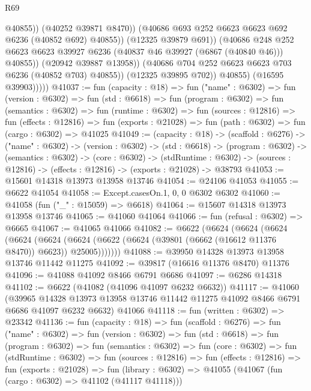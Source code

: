 \begin{lexlean}{R69}
\begin{coremodule}
{                                @40855))
                            (@40252 @39871 @8470))
                          (@40686 @693 @252 @6623 @6623 @692 @6236 (@40852 @692) @40855))
                        (@12325 @39879 @691))
                      (@40686
                        @248
                        @252
                        @6623
                        @6623
                        @39927
                        @6236
                        (@40837 @46 @39927 (@6867 (@40840 @46)))
                        @40855))
                    (@20942 @39887 @13958))
                  (@40686 @704 @252 @6623 @6623 @703 @6236 (@40852 @703) @40855))
                (@12325 @39895 @702))
              @40855)
            (@16595 @39903)))))
@41037 := fun (capacity : @18) =>
  fun ("name" : @6302) =>
  fun (version : @6302) =>
  fun (std : @6618) =>
  fun (program : @6302) =>
  fun (semantics : @6302) =>
  fun (runtime : @6302) =>
  fun (sources : @12816) =>
  fun (effects : @12816) =>
  fun (exports : @21028) => fun (path : @6302) => fun (cargo : @6302) => @41025
@41049 := (capacity : @18) ->
  (scaffold : @6276) ->
  ("name" : @6302) ->
  (version : @6302) ->
  (std : @6618) ->
  (program : @6302) ->
  (semantics : @6302) ->
  (core : @6302) ->
  (stdRuntime : @6302) -> (sources : @12816) -> (effects : @12816) -> (exports : @21028) -> @38793
@41053 := @15601 @14318 @13973 @13958 @13746
@41054 := @24106 @41053
@41055 := @6622 @41054
@41058 := Except.casesOn.{1, 0, 0} @6302 @6302
@41060 := @41058 (fun ("_" : @15059) => @6618)
@41064 := @15607 @14318 @13973 @13958 @13746
@41065 := @41060 @41064
@41066 := fun (refusal : @6302) => @6665
@41067 := @41065 @41066
@41082 := @6622
    (@6624
      (@6624
        (@6624
          (@6624
            (@6624 (@6624 (@6622 (@6624 (@39801 (@6662 (@16612 @11376 @8470)) @6623)) @25005)))))))
@41088 := @39950 @14328 @13973 @13958 @13746 @11442 @11275
@41092 := @39817 (@16616 @11376 @8470) @11376
@41096 := @41088 @41092 @8466 @6791 @6686
@41097 := @6286 @14318
@41102 := @6622 (@41082 (@41096 @41097 @6232 @6632))
@41117 := @41060
    (@39965 @14328 @13973 @13958 @13746 @11442 @11275 @41092 @8466 @6791 @6686 @41097 @6232 @6632)
    @41066
@41118 := fun (written : @6302) => @23342
@41136 := fun (capacity : @18) =>
  fun (scaffold : @6276) =>
  fun ("name" : @6302) =>
  fun (version : @6302) =>
  fun (std : @6618) =>
  fun (program : @6302) =>
  fun (semantics : @6302) =>
  fun (core : @6302) =>
  fun (stdRuntime : @6302) =>
  fun (sources : @12816) =>
  fun (effects : @12816) =>
  fun (exports : @21028) =>
  fun (library : @6302) => @41055 (@41067 (fun (cargo : @6302) => @41102 (@41117 @41118)))
}
\end{coremodule}
\end{lexlean}
